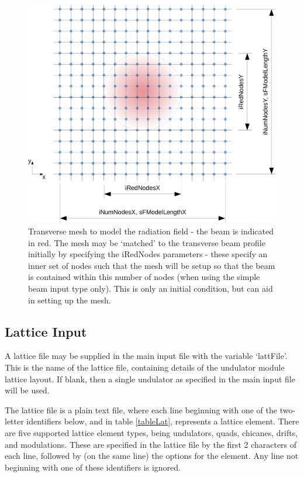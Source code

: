 \documentclass[12pt]{article}%
\begin{document}
\begin{figure}
\centering
\includegraphics[width=150mm]{trans_mesh2.png}
\caption{Transverse mesh to model the radiation field - the beam is indicated in red. The mesh may be `matched' to the transverse beam profile initially by specifying the iRedNodes parameters - these specify an inner set of nodes such that the mesh will be setup so that the beam is contained within this number of nodes (when using the simple beam input type only). This is only an initial condition, but can aid in setting up the mesh.}
\label{trmsh}
\end{figure}



\subsection{Lattice Input}

A lattice file may be supplied in the main input file with the variable `lattFile'. This is the name of the lattice file, containing details of the undulator module lattice layout. If blank, then a single undulator as specified in the main input file will be used.

The lattice file is a plain text file, where each line beginning with one of the two-letter identifiers below, and in table \ref{tableLat}, represents a lattice element. There are five supported lattice element types, being undulators, quads, chicanes, drifts, and modulations. These are specified in the lattice file by the first 2 characters of each line, followed by (on the same line) the options for the element. Any line not beginning with one of these identifiers is ignored.
\end{document}
